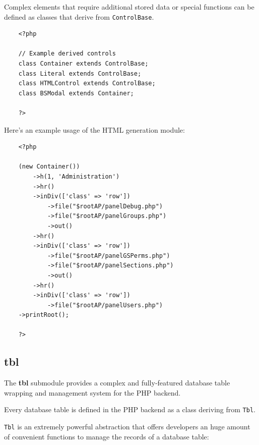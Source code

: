 \documentclass[12pt]{report}
\renewcommand\emph{\textbf}
\begin{document}
                    Complex elements that require additional stored data or special functions can be defined as classes that derive from \texttt{ControlBase}.

                    \begin{verbatim}
    <?php

    // Example derived controls
    class Container extends ControlBase;
    class Literal extends ControlBase;
    class HTMLControl extends ControlBase;
    class BSModal extends Container;

    ?>
                    \end{verbatim}               

                    Here's an example usage of the HTML generation module:

                    \begin{verbatim}
    <?php 

    (new Container())
        ->h(1, 'Administration')
        ->hr()
        ->inDiv(['class' => 'row'])
            ->file("$rootAP/panelDebug.php")
            ->file("$rootAP/panelGroups.php")
            ->out()
        ->hr()
        ->inDiv(['class' => 'row'])
            ->file("$rootAP/panelGSPerms.php")
            ->file("$rootAP/panelSections.php")
            ->out()
        ->hr()
        ->inDiv(['class' => 'row'])
            ->file("$rootAP/panelUsers.php")
    ->printRoot();

    ?>
                    \end{verbatim}           

                \subsection{tbl}

                    The \emph{tbl} submodule provides a complex and fully-featured database table wrapping and management system for the PHP backend.

                    Every database table is defined in the PHP backend as a class deriving from \texttt{Tbl}. 

                    \texttt{Tbl} is an extremely powerful abstraction that offers developers an huge amount of convenient functions to manage the records of a database table:
\end{document}
